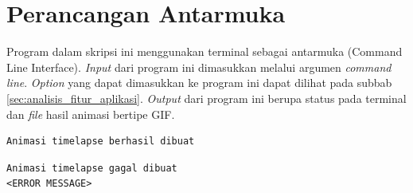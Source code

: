 \section{Perancangan Antarmuka}
\label{sec:perancangan_antarmuka}
Program dalam skripsi ini menggunakan terminal sebagai antarmuka (Command Line Interface). \textit{Input} dari program ini dimasukkan melalui argumen \textit{command line}. \textit{Option} yang dapat dimasukkan ke program ini dapat dilihat pada subbab \ref{sec:analisis_fitur_aplikasi}. \textit{Output} dari program ini berupa status pada terminal dan \textit{file} hasil animasi bertipe GIF.  

\begin{lstlisting}[caption={Status pesan yang muncul pada terminal saat program berhasil membangkitkan animasi \textit{timelapse}.},label={lst:status_pesan_berhasil},language=plaintext]
Animasi timelapse berhasil dibuat
\end{lstlisting}

\begin{lstlisting}[caption={Status pesan yang muncul pada terminal saat program gagal membangkitkan animasi \textit{timelapse}.},label={lst:status_pesan_gagal},language=plaintext]
Animasi timelapse gagal dibuat
<ERROR MESSAGE>
\end{lstlisting}

